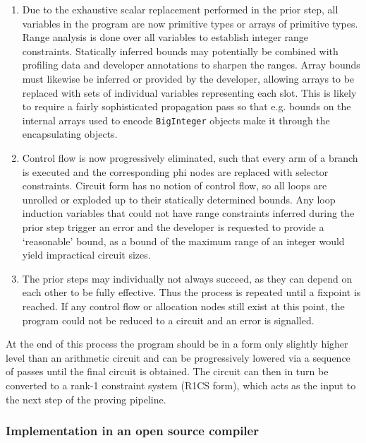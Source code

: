 \documentclass{article}
\begin{document}
\begin{enumerate}
    \item Due to the exhaustive scalar replacement performed in the prior step, all variables in the program are
    now primitive types or arrays of primitive types. Range analysis is done over all variables to establish
    integer range constraints. Statically inferred bounds may potentially be combined with profiling data and
    developer annotations to sharpen the ranges. Array bounds must likewise be inferred or provided by the
    developer, allowing arrays to be replaced with sets of individual variables representing each slot. This
    is likely to require a fairly sophisticated propagation pass so that e.g. bounds on the internal arrays
    used to encode \texttt{BigInteger} objects make it through the encapsulating objects.

    \item Control flow is now progressively eliminated, such that every arm of a branch is executed and the
    corresponding phi nodes are replaced with selector constraints. Circuit form has no notion of control flow, so
    all loops are unrolled or exploded up to their statically determined bounds. Any loop induction variables that
    could not have range constraints inferred during the prior step trigger an error and the developer is requested
    to provide a `reasonable' bound, as a bound of the maximum range of an integer would yield impractical
    circuit sizes.

    \item The prior steps may individually not always succeed, as they can depend on each other to be fully
    effective. Thus the process is repeated until a fixpoint is reached. If any control flow or allocation
    nodes still exist at this point, the program could not be reduced to a circuit and an error is signalled.

\end{enumerate}

At the end of this process the program should be in a form only slightly higher level than an arithmetic circuit
and can be progressively lowered via a sequence of passes until the final circuit is obtained. The circuit can then
in turn be converted to a rank-1 constraint system (R1CS form), which acts as the input to the next step of the
proving pipeline.

\subsubsection{Implementation in an open source compiler}
\end{document}
